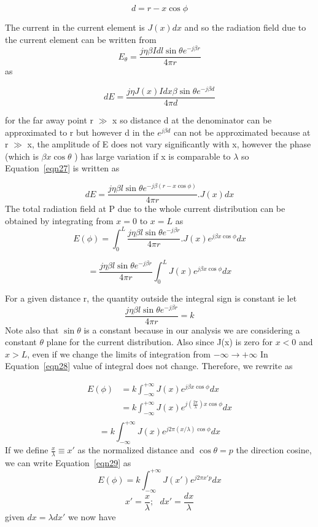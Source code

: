 $$d= r- x\cos\phi$$

The  current in the current element is $J(x)dx$ and so the radiation field due to the current element can be written from $$ E_\theta = \dfrac{j\eta\beta Idl\sin\theta e^{-j\beta r}}{4\pi r} $$
as

\begin{equation}
dE = \dfrac{j\eta J(x) Idx\beta\sin\theta e^{-j\beta d}}{4\pi d}
\label{eqn27}
\end{equation} 

for the far away point r $\gg$ x so distance d at the denominator can  be approximated to r but however d in the $ e^{j\beta d}$ can not be approximated because at r $\gg$ x, the amplitude of E does not vary significantly with x, however the phase (which is  $\beta x\cos\theta$ ) has large variation if x is comparable to $\lambda$  so Equation~\ref{eqn27} is written as

$$ dE = \dfrac{j\eta\beta l\sin\theta e^{-j\beta (r-x\cos\phi)}}{4\pi r}.J(x)dx $$
The  total radiation field at P due to the whole current distribution can be obtained by integrating from  $x = 0$ to $x = L$ as 
$$ E(\phi) = \int_{0}^{L}\dfrac{j\eta\beta l\sin\theta e^{-j\beta r}}{4\pi r}. J(x) e^{j\beta x\cos\phi}dx $$  

\begin{equation}
= \dfrac{j\eta\beta l\sin\theta e^{-j\beta r}}{4\pi r}\int_{0}^{L} J(x) e^{j\beta x \cos\phi}dx
\label{eqn28}
\end{equation} 

For a given distance r, the quantity outside the  integral sign is constant ie let $$ \dfrac{j\eta\beta l\sin\theta e^{-j\beta r}}{4\pi r} = k $$
Note also that $\sin\theta$ is a constant because in our analysis we are considering a constant $\theta$ plane for the current distribution.
Also since J(x) is zero for $x < 0$ and $x >L$, even if we change the limits of integration from $ -\infty\to +\infty$ In Equation~\ref{eqn28}  value of integral does not change. Therefore, we rewrite as 

\begin{align*}
E(\phi) &= k\int_{-\infty}^{+\infty}J(x) e^{j\beta x \cos\phi}dx \\
&= k\int_{-\infty}^{+\infty}J(x) e^{j(\frac{2\pi}{\lambda}) x \cos\phi}dx\\
\end{align*}
\begin{equation}
=k\int_{-\infty}^{+\infty}J(x) e^{j2\pi(x/\lambda)  \cos\phi}dx
\label{eqn29}
\end{equation}
If we define $\frac{x}{\lambda} \equiv x'$ as the normalized distance and $\cos\theta = p$ 
the direction cosine, we can write Equation~\ref{eqn29} as 
$$E(\phi) = k\int_{-\infty}^{+\infty}J(x') e^{j2\pi x' p }dx$$
$$ x' = \frac{x}{\lambda}; \ \ \ dx' = \frac{dx}{\lambda}$$
given $dx = \lambda dx'$ we now have


